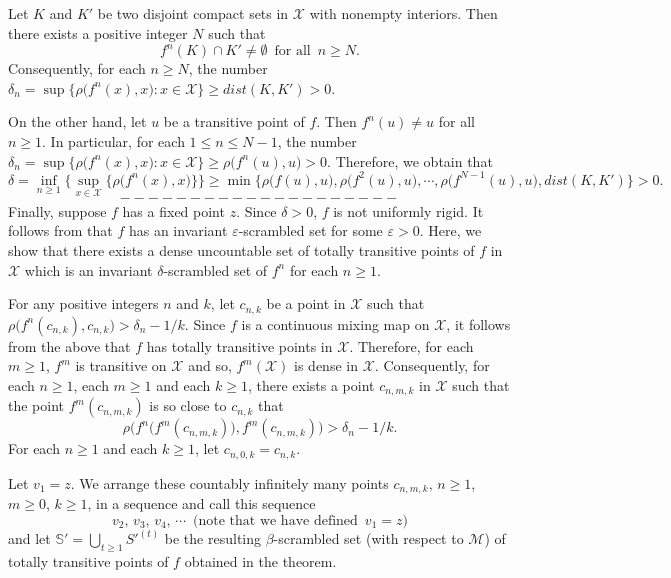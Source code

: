 \documentclass[12pt]{article}
\newcommand{\va}{\varepsilon}
\begin{document}
Let $K$ and $K'$ be two disjoint compact sets in $\mathcal X$ with nonempty interiors.  Then there exists a positive integer $N$ such that $$f^n(K) \cap K' \ne \emptyset \,\,\, \text{for all} \,\,\, n \ge N.$$Consequently, for each $n \ge N$, the number $\delta_n = \sup \{ \rho\big(f^n(x), x\big): x \in \mathcal X \} \ge dist(K, K') > 0$.  

On the other hand, let $u$ be a transitive point of $f$.  Then $f^n(u) \ne u$ for all $n \ge 1$.  In particular, for each $1 \le n \le N-1$, the number $\delta_n = \sup \big\{ \rho\big(f^n(x), x\big): x \in \mathcal X \big\} \ge \rho\big(f^n(u), u\big) > 0$.  Therefore, we obtain that 
$$
\delta = \inf_{n \ge 1} \bigg\{\sup_{x \in \mathcal X} \big\{ \rho\big(f^n(x), x\big) \big\} \bigg\} \ge \min \big\{ \rho\big(f(u), u\big), \rho\big(f^2(u), u\big), \cdots, \rho\big(f^{N-1}(u), u\big), dist(K, K') \big\} > 0.
$$
$$--------------------$$
\indent Finally, suppose $f$ has a fixed point $z$.  Since $\delta > 0$, $f$ is not uniformly rigid.  It follows from {\bf\cite{fo}} that $f$ has an invariant $\va$-scrambled set for some $\va > 0$.  Here, we show that there exists a dense uncountable set of totally transitive points of $f$ in $\mathcal X$ which is an invariant $\delta$-scrambled set of $f^n$ for each $n \ge 1$.

For any positive integers $n$ and $k$, let $c_{n,k}$ be a point in $\mathcal X$ such that $\rho\big(f^n(c_{n,k}), c_{n,k} \big) > \delta_n       - 1/k$.  Since $f$ is a continuous mixing map on $\mathcal X$, it follows from the above that $f$ has totally transitive points in $\mathcal X$.  Therefore, for each $m \ge 1$, $f^m$ is transitive on $\mathcal X$ and so, $f^m(\mathcal X)$ is dense in $\mathcal X$.  Consequently, for each $n \ge 1$, each $m \ge 1$ and each $k \ge 1$, there exists a point $c_{n,m,k}$ in $\mathcal X$ such that the point $f^m(c_{n,m,k})$ is so close to $c_{n,k}$ that 
$$
\rho\big(f^n\big(f^m(c_{n,m,k})\big), f^m(c_{n,m,k})\big) > \delta_n - 1/k.
$$
For each $n \ge 1$ and each $k \ge 1$, let $c_{n,0,k} = c_{n,k}$.

Let $v_1 = z$. We arrange these countably infinitely many points $c_{n,m,k}, \, n \ge 1$, $m \ge 0$, $k \ge 1$, in a sequence and call this sequence 
$$
v_2, \, v_3, \, v_4, \, \cdots \,\,\, \text{(note that we have defined} \,\,\, v_1 = z)
$$
and let $\mathbb S' = \bigcup_{t \ge 1} S'^{(t)}$ be the resulting $\beta$-scrambled set (with respect to $\mathcal M$) of totally transitive points of $f$ obtained in the theorem.   
\end{document}
